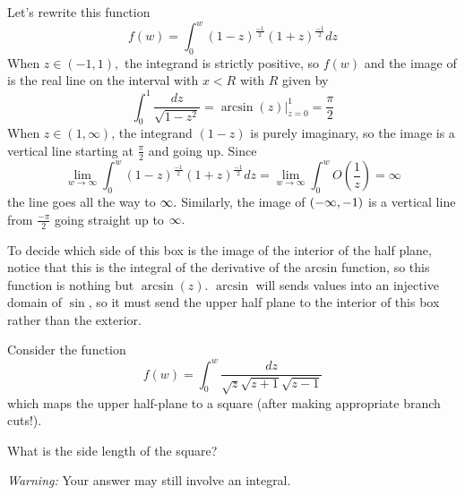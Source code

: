 \documentclass{homework}
\begin{document}
                                            \begin{solution}

                                            Let's rewrite this function 
                                              \[
                                                  f(w) = \int_0^w  (1-z)^\frac{-1}{2}(1+z)^\frac{-1}{2} dz
                                                    \]
                                                    When $z\in (-1, 1),$ the integrand is strictly positive, so $f(w)$ and the image of is the real line on the interval with $x<R$ with $R$ given by
                                                    \[
                                                    \int_0^1 \frac{dz}{\sqrt{1-z^2}} = \arcsin(z)\bigg|_{z=0}^1 = \frac{\pi}{2}
                                                    \]
                                                    When $z\in (1, \infty)$, the integrand $(1-z)$ is purely imaginary, so the image is a vertical line starting at $\frac{\pi}{2}$ and going up. Since
                                                    \[
                                                    \lim_{w\to\infty} \int_0^w (1-z)^\frac{-1}{2}(1+z)^\frac{-1}{2} dz = \lim_{w\to\infty} \int_0^w O(\frac{1}{z}) = \infty
                                                    \]
                                                    the line goes all the way to $\infty.$ Similarly, the image of $(-\infty, -1)$ is a vertical line from $\frac{-\pi}{2}$ going straight up to $\infty.$

                                                    To decide which side of this box is the image of the interior of the half plane, notice that this is the integral of the derivative of the arcsin function, so this function is nothing but $\arcsin(z)$. $\arcsin$ will sends values into an injective domain of $\sin$, so it must send the upper half plane to the interior of this box rather than the exterior.
                                                    \end{solution}
                                                    \begin{problem}
                                                      Consider the function
                                                        \[
                                                            f(w) = \int_0^w  \frac{dz}{\sqrt{z} \sqrt{z+1} \sqrt{z-1}}
                                                              \]
                                                                which maps the upper half-plane to a square (after making appropriate branch cuts!).

                                                                  What is the side length of the square?

                                                                    \textit{Warning:} Your answer may still involve an integral.
                                                                    \end{problem}
\end{document}
